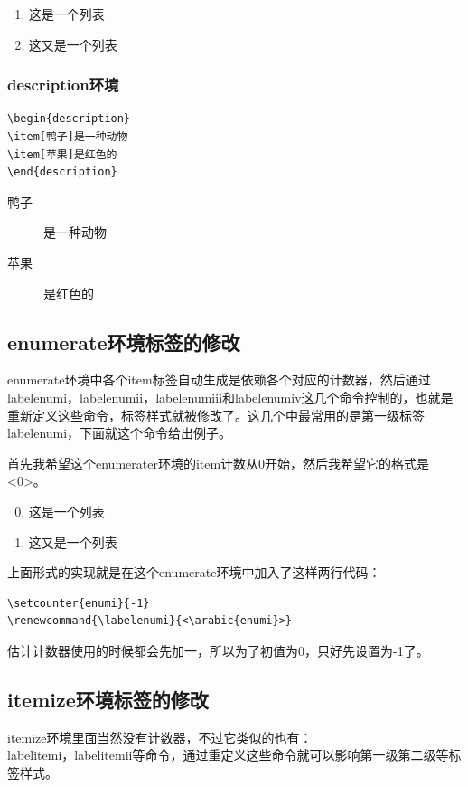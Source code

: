 \documentclass[12pt,oneside]{book}
\begin{document}
\begin{common-format}
\begin{enumerate}
\item 这是一个列表
\item 这又是一个列表
\end{enumerate}

\subsubsection{description环境}
\begin{Verbatim}
\begin{description}
\item[鸭子]是一种动物
\item[苹果]是红色的
\end{description}
\end{Verbatim}
\begin{description}
\item[鸭子]是一种动物
\item[苹果]是红色的
\end{description}

\subsection{enumerate环境标签的修改}
\label{sec:enumerate环境标签的修改}
enumerate环境中各个item标签自动生成是依赖各个对应的计数器，然后通过labelenumi，labelenumii，labelenumiii和labelenumiv这几个命令控制的，也就是重新定义这些命令，标签样式就被修改了。这几个中最常用的是第一级标签labelenumi，下面就这个命令给出例子。

首先我希望这个enumerater环境的item计数从0开始，然后我希望它的格式是<0>。

\begin{enumerate}
\setcounter{enumi}{-1}
\renewcommand{\labelenumi}{<\arabic{enumi}>}
\item 这是一个列表
\item 这又是一个列表
\end{enumerate}

上面形式的实现就是在这个enumerate环境中加入了这样两行代码：
\begin{Verbatim}
\setcounter{enumi}{-1}
\renewcommand{\labelenumi}{<\arabic{enumi}>}
\end{Verbatim}
估计计数器使用的时候都会先加一，所以为了初值为0，只好先设置为-1了。

\subsection{itemize环境标签的修改}
itemize环境里面当然没有计数器，不过它类似的也有：\\ labelitemi，labelitemii等命令，通过重定义这些命令就可以影响第一级第二级等标签样式。









\end{common-format}
\end{document}
